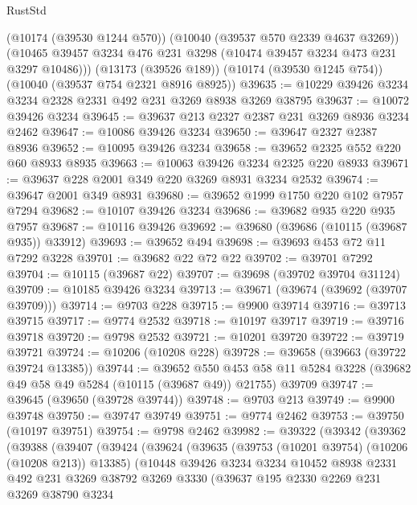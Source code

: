 \begin{lexlean}{RustStd}
\begin{coremodule}
      (@10174 (@39530 @1244 @570))
      (@10040 (@39537 @570 @2339 @4637 @3269))
      (@10465 @39457 @3234 @476 @231 @3298 (@10474 @39457 @3234 @473 @231 @3297 @10486)))
    (@13173 (@39526 @189))
    (@10174 (@39530 @1245 @754))
    (@10040 (@39537 @754 @2321 @8916 @8925))
@39635 := @10229 @39426 @3234 @3234 @2328 @2331 @492 @231 @3269 @8938 @3269 @38795
@39637 := @10072 @39426 @3234
@39645 := @39637 @213 @2327 @2387 @231 @3269 @8936 @3234 @2462
@39647 := @10086 @39426 @3234
@39650 := @39647 @2327 @2387 @8936
@39652 := @10095 @39426 @3234
@39658 := @39652 @2325 @552 @220 @60 @8933 @8935
@39663 := @10063 @39426 @3234 @2325 @220 @8933
@39671 := @39637 @228 @2001 @349 @220 @3269 @8931 @3234 @2532
@39674 := @39647 @2001 @349 @8931
@39680 := @39652 @1999 @1750 @220 @102 @7957 @7294
@39682 := @10107 @39426 @3234
@39686 := @39682 @935 @220 @935 @7957
@39687 := @10116 @39426
@39692 := @39680 (@39686 (@10115 (@39687 @935)) @33912)
@39693 := @39652 @494
@39698 := @39693 @453 @72 @11 @7292 @3228
@39701 := @39682 @22 @72 @22
@39702 := @39701 @7292
@39704 := @10115 (@39687 @22)
@39707 := @39698 (@39702 @39704 @31124)
@39709 := @10185 @39426 @3234
@39713 := @39671 (@39674 (@39692 (@39707 @39709)))
@39714 := @9703 @228
@39715 := @9900 @39714
@39716 := @39713 @39715
@39717 := @9774 @2532
@39718 := @10197 @39717
@39719 := @39716 @39718
@39720 := @9798 @2532
@39721 := @10201 @39720
@39722 := @39719 @39721
@39724 := @10206 (@10208 @228)
@39728 := @39658 (@39663 (@39722 @39724 @13385))
@39744 := @39652
    @550
    @453
    @58
    @11
    @5284
    @3228
    (@39682 @49 @58 @49 @5284 (@10115 (@39687 @49)) @21755)
    @39709
@39747 := @39645 (@39650 (@39728 @39744))
@39748 := @9703 @213
@39749 := @9900 @39748
@39750 := @39747 @39749
@39751 := @9774 @2462
@39753 := @39750 (@10197 @39751)
@39754 := @9798 @2462
@39982 := @39322
    (@39342
      (@39362
        (@39388
          (@39407
            (@39424
              (@39624
                (@39635
                  (@39753 (@10201 @39754) (@10206 (@10208 @213)) @13385)
                  (@10448
                    @39426
                    @3234
                    @3234
                    @10452
                    @8938
                    @2331
                    @492
                    @231
                    @3269
                    @38792
                    @3269
                    @3330
                    (@39637
                      @195
                      @2330
                      @2269
                      @231
                      @3269
                      @38790
                      @3234

\end{coremodule}
\end{lexlean}
